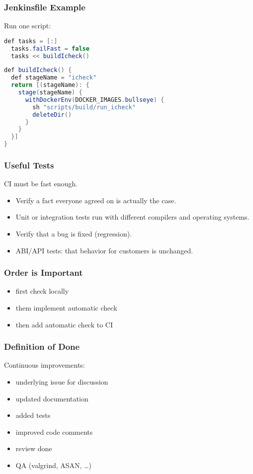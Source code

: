 \begin{frame}[fragile]
	\frametitle{Jenkinsfile Example}

	Run one script:
	\begin{lstlisting}[language=Java]
  def tasks = [:]
  tasks.failFast = false
  tasks << buildIcheck()
\end{lstlisting}

	\begin{lstlisting}[language=Java]
def buildIcheck() {
  def stageName = "icheck"
  return [(stageName): {
    stage(stageName) {
      withDockerEnv(DOCKER_IMAGES.bullseye) {
        sh "scripts/build/run_icheck"
        deleteDir()
      }
    }
  }]
}
\end{lstlisting}
\end{frame}

\begin{frame}
	\frametitle{Useful Tests}

	\begin{problem}
	CI must be fast enough.
	\end{problem}

	\begin{itemize}[<+-| alert@+>]

	\item Verify a fact everyone agreed on is actually the case.
	\item Unit or integration tests run with different compilers and operating systems.
	\item Verify that a bug is fixed (regression).
	\item ABI/API tests: that behavior for customers is unchanged.
	\end{itemize}
\end{frame}

\begin{frame}
	\frametitle{Order is Important}

	\begin{itemize}[<+-| alert@+>]

	\item first check locally
	\item them implement automatic check
	\item then add automatic check to CI
	\end{itemize}
\end{frame}

\begin{frame}
	\frametitle{Definition of Done}

	Continuous improvements:

	\begin{itemize}
	\item underlying issue for discussion
	\item updated documentation
	\item added tests
	\item improved code comments
	\item review done
	\item QA (valgrind, ASAN, \dots)
	\end{itemize}
\end{frame}



